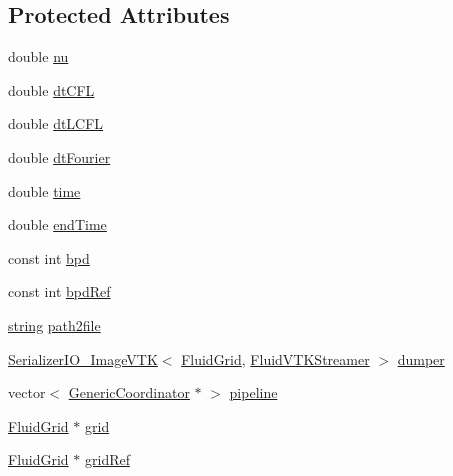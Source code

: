 \subsection*{Protected Attributes}
\begin{DoxyCompactItemize}
\item 
double \hyperlink{class_test_shear_layer_a8e9e375ce171b4dee291df0e5d6e0cd8}{nu}
\item 
double \hyperlink{class_test_shear_layer_a527311497df3919f2856cb569f969789}{dt\+C\+F\+L}
\item 
double \hyperlink{class_test_shear_layer_ab204b3387698686c55a8857944acbc96}{dt\+L\+C\+F\+L}
\item 
double \hyperlink{class_test_shear_layer_a814c75cb422565231d79bbc2856108dc}{dt\+Fourier}
\item 
double \hyperlink{class_test_shear_layer_a9bb6635bfe059399be2ddb9c7c198c8f}{time}
\item 
double \hyperlink{class_test_shear_layer_ad7fee047a8ee9149cbc69aa482d88afb}{end\+Time}
\item 
const int \hyperlink{class_test_shear_layer_aa786becaa4125bd36246994a2243359a}{bpd}
\item 
const int \hyperlink{class_test_shear_layer_a28767796bba8ba08d3ee8b0493240b89}{bpd\+Ref}
\item 
\hyperlink{testfpzip_8cpp_a984bb8e04129c4268bd6ff36a50c9fa4}{string} \hyperlink{class_test_shear_layer_a2901ad02abff121d918f7db97e64ab8a}{path2file}
\item 
\hyperlink{class_serializer_i_o___image_v_t_k}{Serializer\+I\+O\+\_\+\+Image\+V\+T\+K}$<$ \hyperlink{_definitions_8h_aff3288a3741f5098bcc456bb13440189}{Fluid\+Grid}, \hyperlink{struct_fluid_v_t_k_streamer}{Fluid\+V\+T\+K\+Streamer} $>$ \hyperlink{class_test_shear_layer_a9b8052967a1a5c9d586c9f815e05332b}{dumper}
\item 
vector$<$ \hyperlink{class_generic_coordinator}{Generic\+Coordinator} $\ast$ $>$ \hyperlink{class_test_shear_layer_a90483bd2321290d9e491bc4cd2149327}{pipeline}
\item 
\hyperlink{_definitions_8h_aff3288a3741f5098bcc456bb13440189}{Fluid\+Grid} $\ast$ \hyperlink{class_test_shear_layer_a48e9abfc5c1a95b1c48cec2b2d7d3383}{grid}
\item 
\hyperlink{_definitions_8h_aff3288a3741f5098bcc456bb13440189}{Fluid\+Grid} $\ast$ \hyperlink{class_test_shear_layer_afbab5a03e64079f810e20b55b16f9b65}{grid\+Ref}
\end{DoxyCompactItemize}


